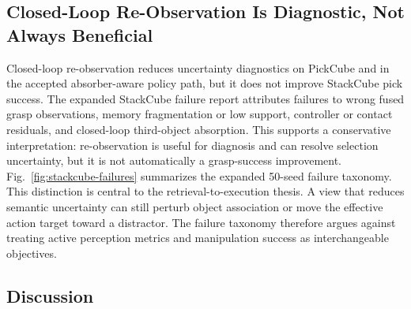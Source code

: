 \documentclass[conference]{IEEEtran}
\begin{document}
\subsection{Closed-Loop Re-Observation Is Diagnostic, Not Always Beneficial}

Closed-loop re-observation reduces uncertainty diagnostics on PickCube and in
the accepted absorber-aware policy path, but it does not improve StackCube pick
success. The expanded StackCube failure report attributes failures to wrong
fused grasp observations, memory fragmentation or low support, controller or
contact residuals, and closed-loop third-object absorption. This supports a
conservative interpretation: re-observation is useful for diagnosis and can
resolve selection uncertainty, but it is not automatically a grasp-success
improvement. Fig.~\ref{fig:stackcube-failures} summarizes the expanded
50-seed failure taxonomy.
This distinction is central to the retrieval-to-execution thesis. A view that
reduces semantic uncertainty can still perturb object association or move the
effective action target toward a distractor. The failure taxonomy therefore
argues against treating active perception metrics and manipulation success as
interchangeable objectives.

\subsection{Discussion}
\end{document}
